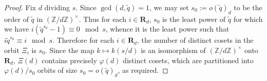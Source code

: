 \documentclass[10pt,a4paper]{amsart}
\newcommand{\Z}{\mathbb{Z}} %
\begin{document}
\begin{proof}
    Fix $d$ dividing $s$.  Since  $\gcd(d,\tilde{q})=1$, we may set $s_0:=o(\tilde{q})_d$ to be the order of $\tilde{q}$ in $(\Z/d\Z)^\times$. Thus for each $i\in {\mathbf R}_d$,  $s_0$ is the least power of $\tilde{q}$ for which we have $i(\tilde{q}^{s_0}-1)\equiv 0\mod s$, whence it is the least power such that $i\tilde{q}^{s_0}\equiv i\mod s$. Therefore for each $i\in {\mathbf R}_d$, the number of distinct cosets in the orbit $\Xi_i$ is $s_0$.  Since the map $k\mapsto k(s/d)$ is an isomorphism of $(\Z/d\Z)^\times$ onto ${\mathbf R}_d$, $\Xi(d)$ contains precisely $\varphi(d)$ distinct cosets, which are partitioned into $\varphi(d)/s_0$ orbits of size $s_0=o(\tilde{q})_d$, as required.
\end{proof}
\end{document}
